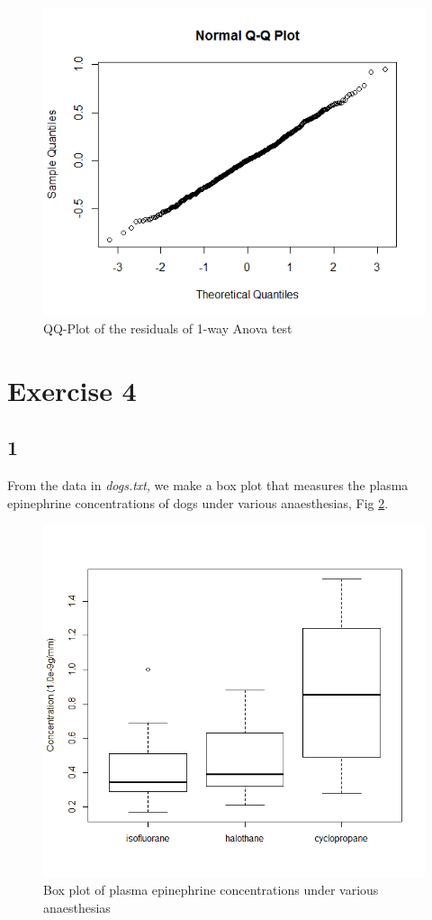 \documentclass{article}
\begin{document}
    \begin{figure}[H]
    \centering
      \includegraphics[scale=0.4]{../results/3_6.png}
      \caption{QQ-Plot of the residuals of 1-way Anova test}
      \label{fig:qq-resid}
    \end{figure}
    
    \section{Exercise 4}
    \subsection*{1}
    From the data in \textit{dogs.txt}, we make a box plot that measures the plasma epinephrine concentrations of dogs under various anaesthesias, Fig \ref{fig:dbox}.
    
    \begin{figure}[H]
    \centering
      \includegraphics[scale=0.3]{../results/4_1.png}
      \caption{Box plot of plasma epinephrine concentrations under various anaesthesias}
      \label{fig:dbox}
    \end{figure}
    
\end{document}
